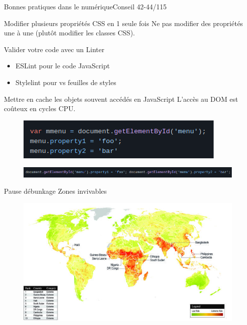 \begin{frame}{Bonnes pratiques dans le numérique}{Conseil 42-44/115}
\begin{block}{Modifier plusieurs propriétés CSS en 1 seule fois}
Ne pas modifier des propriétés une à une (plutôt modifier les classes CSS).
\end{block}
\begin{block}{Valider votre code avec un Linter}
\begin{itemize}
    \item  ESLint pour le code JavaScript
    \item Stylelint pour vs feuilles de styles
\end{itemize}
\end{block}

\begin{block}{Mettre en cache les objets souvent accédés en JavaScript}
L’accès au DOM est coûteux en cycles CPU.
\begin{figure}
    \centering
    \includegraphics[scale=0.35]{chapitre2/wdd4/fig/c6.png}
\end{figure}
\begin{figure}
    \centering
    \includegraphics[scale=0.35]{chapitre2/wdd4/fig/c7.png}
\end{figure}
\end{block}


\end{frame}


\begin{frame}{Pause débunkage }{Zones invivables}
\begin{figure}
    \centering
    \includegraphics[scale=2]{chapitre2/wdd4/fig/climat.jpg}
\end{figure}
\end{frame}